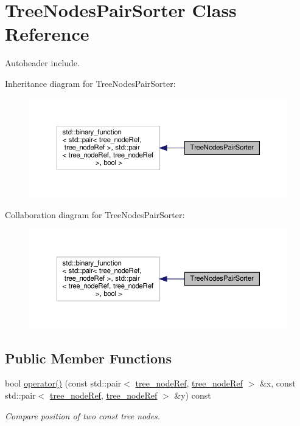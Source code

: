 \hypertarget{classTreeNodesPairSorter}{}\section{Tree\+Nodes\+Pair\+Sorter Class Reference}
\label{classTreeNodesPairSorter}


Autoheader include.  




Inheritance diagram for Tree\+Nodes\+Pair\+Sorter\+:
\nopagebreak
\begin{figure}[H]
\begin{center}
\leavevmode
\includegraphics[width=350pt]{dc/dba/classTreeNodesPairSorter__inherit__graph}
\end{center}
\end{figure}


Collaboration diagram for Tree\+Nodes\+Pair\+Sorter\+:
\nopagebreak
\begin{figure}[H]
\begin{center}
\leavevmode
\includegraphics[width=350pt]{d5/d68/classTreeNodesPairSorter__coll__graph}
\end{center}
\end{figure}
\subsection*{Public Member Functions}
\begin{DoxyCompactItemize}
\item 
bool \hyperlink{classTreeNodesPairSorter_a7842f04c3f3690237eb1d37b67ed8904}{operator()} (const std\+::pair$<$ \hyperlink{tree__node_8hpp_a6ee377554d1c4871ad66a337eaa67fd5}{tree\+\_\+node\+Ref}, \hyperlink{tree__node_8hpp_a6ee377554d1c4871ad66a337eaa67fd5}{tree\+\_\+node\+Ref} $>$ \&x, const std\+::pair$<$ \hyperlink{tree__node_8hpp_a6ee377554d1c4871ad66a337eaa67fd5}{tree\+\_\+node\+Ref}, \hyperlink{tree__node_8hpp_a6ee377554d1c4871ad66a337eaa67fd5}{tree\+\_\+node\+Ref} $>$ \&y) const
\begin{DoxyCompactList}\small\item\em Compare position of two const tree nodes. \end{DoxyCompactList}\end{DoxyCompactItemize}


